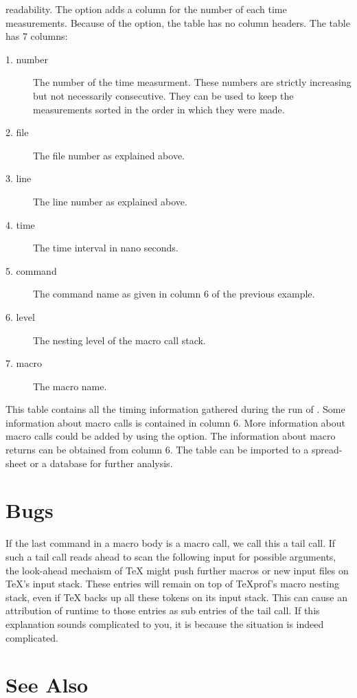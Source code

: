\documentclass[a4paper,english]{article}
\begin{document}
\begin{description}
  readability. The option  adds a column for the number
  of each time measurements.
  Because of the  option, the table has no column headers.
  The table has  7 columns:
  \begin{description}
  \item[1. number] The number of the time measurment.
    These numbers are strictly increasing but not necessarily consecutive.
    They can be used to keep the measurements sorted in the order in which
    they were made.
    \item[2. file] The file number as explained above.
    \item[3. line] The line number as explained above.
    \item[4. time] The time interval in nano seconds.
    \item[5. command] The command name as given in column 6 of the previous example.
    \item[6. level ] The nesting level of the macro call stack.
    \item[7. macro] The macro name.
  \end{description}
  This table contains all the timing information gathered during the run
  of . Some information about macro calls is contained in
  column 6. More information about macro calls could be added
  by using the  option. The information about macro returns
  can be obtained from column 6.
  The table can be imported to a spread-sheet or a database for further
  analysis.
\end{description}


\section{Bugs}
If the last command in a macro body is a macro call, we call this a tail call.
If such a tail call reads ahead to scan the following input
for possible arguments, the look-ahead mechaism of TeX might push further
macros or new input files on TeX's input stack.
These entries will remain on top of TeXprof's macro nesting stack,
even if TeX backs up all these tokens on its input stack.
This can cause an attribution of runtime to those entries as sub entries
of the tail call. If this explanation sounds complicated to you, it is
because the situation is indeed complicated. 

\section{See Also}
\end{document}
